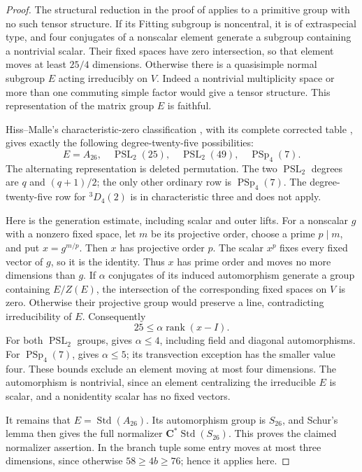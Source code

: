 \documentclass[11pt]{article}
\theoremstyle{definition}
\theoremstyle{remark}
\newcommand{\C}{\mathbf C}
\begin{document}
\begin{proof}
The structural reduction in the proof of
\cite[Theorem~7.1, p.~549]{GS} applies to a primitive group with no
such tensor structure. If its Fitting subgroup is noncentral, it is
of extraspecial type, and four conjugates of a nonscalar element
 generate a subgroup containing a nontrivial scalar. Their fixed
spaces have zero intersection, so that element moves at least
$25/4$ dimensions. Otherwise there is a quasisimple normal subgroup
$E$ acting irreducibly on $V$. Indeed a nontrivial multiplicity space
or more than one commuting simple factor would give a tensor
structure. This representation of the matrix group $E$ is faithful.

Hiss--Malle's characteristic-zero classification
\cite[Theorem~1 and Table~2, pp.~22 and 31]{HissMalle}, with its
complete corrected table \cite[pp.~95--96 and 102]{HissMalleCorrection},
gives exactly the following degree-twenty-five possibilities:
\[
 E=A_{26},\quad \operatorname{PSL}_2(25),\quad
 \operatorname{PSL}_2(49),\quad \operatorname{PSp}_4(7).
\]
The alternating representation is deleted permutation. The two
$\operatorname{PSL}_2$ degrees are $q$ and $(q+1)/2$; the only other
ordinary row is $\operatorname{PSp}_4(7)$. The degree-twenty-five row
for ${}^3D_4(2)$ is in characteristic three and does not apply.

Here is the generation estimate, including scalar and outer lifts.
For a nonscalar $g$ with a nonzero fixed space, let $m$ be its
projective order, choose a prime $p\mid m$, and put $x=g^{m/p}$.
Then $x$ has projective order $p$. The scalar $x^p$ fixes every fixed
vector of $g$, so it is the identity. Thus $x$ has prime order and
moves no more dimensions than $g$. If $\alpha$ conjugates of its
induced automorphism generate a group containing $E/Z(E)$, the
intersection of the corresponding fixed spaces on $V$ is zero.
Otherwise their projective group would preserve a line, contradicting
irreducibility of $E$. Consequently
\[
 25\le\alpha\operatorname{rank}(x-I).
\]
For both $\operatorname{PSL}_2$ groups,
\cite[Lemma~3.1, pp.~527--529]{GS} gives $\alpha\le4$, including
field and diagonal automorphisms. For $\operatorname{PSp}_4(7)$,
\cite[Theorem~4.3, p.~534]{GS} gives $\alpha\le5$; its transvection
exception has the smaller value four. These bounds exclude an
 element moving at most four dimensions. The automorphism is
nontrivial, since an element centralizing the irreducible $E$ is
scalar, and a nonidentity scalar has no fixed vectors.

It remains that $E=\operatorname{Std}(A_{26})$. Its automorphism group
is $S_{26}$, and Schur's lemma then gives the full normalizer
$\C^*\operatorname{Std}(S_{26})$. This proves the claimed normalizer
assertion. In the branch tuple some entry moves at most three
 dimensions, since otherwise $58\ge4b\ge76$; hence it applies here.


\end{proof}
\end{document}
